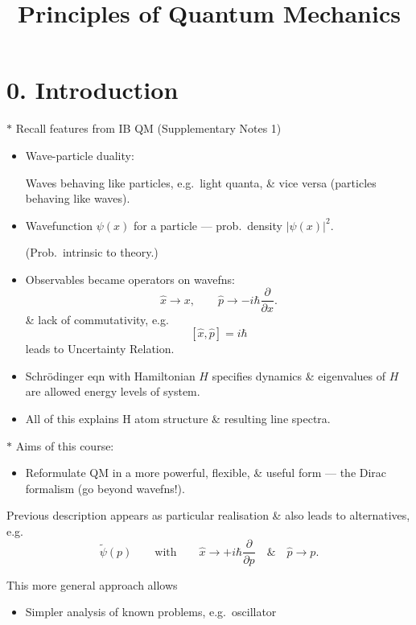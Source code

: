\documentclass[11pt,a4paper]{article}
\title{Principles of Quantum Mechanics}
\begin{document}
\maketitle
\thispagestyle{empty}
\section*{0. Introduction}

\noindent
$\ast$ Recall features from IB QM (Supplementary Notes 1)

\begin{itemize}
    \item Wave-particle duality:
    
    Waves behaving like particles, e.g.\ light quanta,
    \& vice versa (particles behaving like waves).
    
    \item Wavefunction $\psi(x)$ for a particle --- prob.\ density
    $|\psi(x)|^2$.
    
    (Prob.\ intrinsic to theory.)
    
    \item Observables became operators on wavefns:
    \[
        \hat{x} \to x,
        \qquad
        \hat{p} \to -i\hbar\frac{\partial}{\partial x}.
    \]
    \& lack of commutativity, e.g.
    \[
        [\hat{x},\hat{p}] = i\hbar
    \]
    leads to Uncertainty Relation.
    
    \item Schr\"odinger eqn with Hamiltonian $H$ specifies dynamics
    \& eigenvalues of $H$ are allowed energy levels of system.
    
    \item All of this explains H atom structure \& resulting line spectra.
\end{itemize}

\noindent
$\ast$ Aims of this course:

\begin{itemize}
    \item Reformulate QM in a more powerful, flexible, \& useful form
    --- the Dirac formalism (go beyond wavefns!).
\end{itemize}

Previous description appears as particular realisation
\& also leads to alternatives, e.g.
\[
    \tilde{\psi}(p)
    \qquad \text{with} \qquad
    \hat{x} \to +i\hbar\frac{\partial}{\partial p}
    \quad \& \quad
    \hat{p} \to p.
\]

This more general approach allows
\begin{itemize}
    \item Simpler analysis of known problems, e.g.\ oscillator
\end{itemize}
\end{document}
